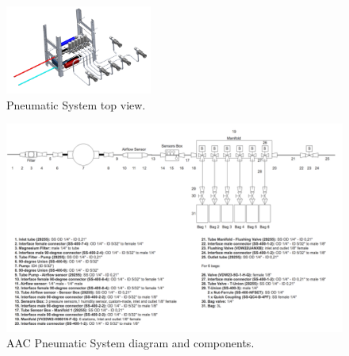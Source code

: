 
\begin{figure}[H]
    \centering
   \includegraphics[width=0.43\textwidth]{4-experiment-design/img/Mechanical/Pneumatic_System.png}
   \caption{Pneumatic System top view.}
    \label{pneumatic_system_cad}
\end{figure}



\newpage
\begin{landscape}
\begin{figure}[H]
    \centering
    \includegraphics[width=1.45\textwidth]{4-experiment-design/img/Mechanical/AAC_Subsystem.png}
    \caption{AAC Pneumatic System diagram and components.}
    \label{pneumatic_system}
\end{figure}
\end{landscape}

\raggedbottom